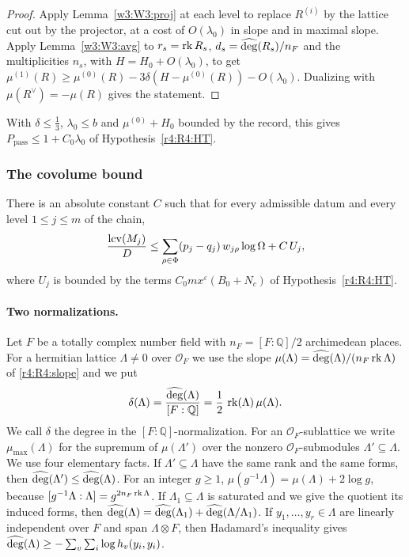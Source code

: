 \begin{proof}
Apply Lemma~\ref{w3:W3:proj} at each level to replace $R^{(i)}$ by the lattice cut out by the projector, at a cost of $O(\lambda_0)$ in slope and in maximal slope. Apply Lemma~\ref{w3:W3:avg} to $r_s=\operatorname{rk} R_s$, $d_s=\widehat{\deg}(R_s)/n_F$ and the multiplicities $n_s$, with $H=H_0+O(\lambda_0)$, to get $\mu^{(1)}(R)\ge\mu^{(0)}(R)-3\delta(H-\mu^{(0)}(R))-O(\lambda_0)$. Dualizing with $\mu(R^\vee)=-\mu(R)$ gives the statement. 
\end{proof}

With $\delta\le\frac13$, $\lambda_0\le b$ and $\mu^{(0)}+H_0$ bounded by the record, this gives $P_{\mathrm{pass}}\le1+C_0\lambda_0$ of Hypothesis~\ref{r4:R4:HT}.

\subsubsection{The covolume bound}

\begin{hypothesis}\label{w3:W3:L3}
There is an absolute constant $C$ such that for every admissible datum and every level $1\le j\le m$ of the chain,
\[
\frac{\operatorname{lcv}(M_j)}D\le\sum_{\rho\in\Phi}(p_j-q_j)\,w_{j\rho}\log\Omega+C\,U_j,
\]
where $U_j$ is bounded by the terms $C_0mx^\varepsilon(B_0+N_c)$ of Hypothesis~\ref{r4:R4:HT}.
\end{hypothesis}

\paragraph{Two normalizations.}
Let $F$ be a totally complex number field with $n_F=[F:\mathbb Q]/2$ archimedean places. For a hermitian lattice $\Lambda\neq0$ over $\mathcal O_F$ we use the slope $\mu(\Lambda)=\widehat{\deg}(\Lambda)/(n_F\operatorname{rk}\Lambda)$ of \eqref{r4:R4:slope} and we put
\[
\delta(\Lambda)=\frac{\widehat{\deg}(\Lambda)}{[F:\mathbb Q]}=\frac12\,\operatorname{rk}(\Lambda)\,\mu(\Lambda).
\]
We call $\delta$ the degree in the $[F:\mathbb Q]$-normalization. For an $\mathcal O_F$-sublattice we write $\mu_{\max}(\Lambda)$ for the supremum of $\mu(\Lambda')$ over the nonzero $\mathcal O_F$-submodules $\Lambda'\subseteq\Lambda$. We use four elementary facts. If $\Lambda'\subseteq\Lambda$ have the same rank and the same forms, then $\widehat{\deg}(\Lambda')\le\widehat{\deg}(\Lambda)$. For an integer $g\ge1$, $\mu(g^{-1}\Lambda)=\mu(\Lambda)+2\log g$, because $[g^{-1}\Lambda:\Lambda]=g^{2n_F\operatorname{rk}\Lambda}$. If $\Lambda_1\subseteq\Lambda$ is saturated and we give the quotient its induced forms, then $\widehat{\deg}(\Lambda)=\widehat{\deg}(\Lambda_1)+\widehat{\deg}(\Lambda/\Lambda_1)$. If $y_1,\dots,y_r\in\Lambda$ are linearly independent over $F$ and span $\Lambda\otimes F$, then Hadamard's inequality gives $\widehat{\deg}(\Lambda)\ge-\sum_v\sum_i\log h_v(y_i,y_i)$.

